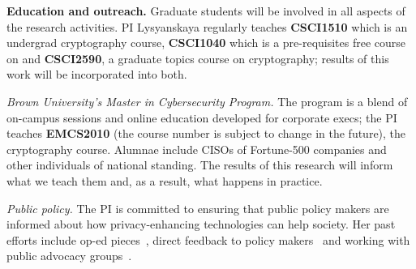 \noindent\textbf{Education and outreach.} Graduate students will be involved in all aspects of the research activities.  PI Lysyanskaya
regularly teaches \textbf{CSCI1510} which is an undergrad cryptography course, \textbf{CSCI1040} which is a pre-requisites free course on  and \textbf{CSCI2590}, a graduate topics course on cryptography; results of this work will be incorporated into both.

\noindent\textit{Brown University's Master in Cybersecurity Program.} The program is a blend of on-campus sessions and online education developed for corporate execs; the PI teaches \textbf{EMCS2010} (the course number is subject to change in the future), the cryptography course.  Alumnae include CISOs of Fortune-500 companies and other individuals of national standing.  
The results of this research will inform what we teach them and, as a result, what happens in practice.

\noindent\textit{Public policy.} The PI is committed to ensuring that public policy makers are informed about how privacy-enhancing technologies can help society.  Her past efforts include op-ed pieces~\cite{projo1,csm,projo2}, direct feedback to policy makers~\cite{annacdt} and working with public advocacy groups~\cite{epic15}.  

